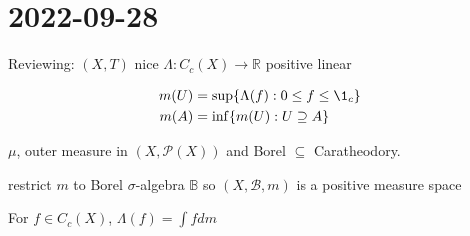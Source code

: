 \section{ 2022-09-28 }


Reviewing: $(X,T)$ nice $\Lambda : C_c (X) \to \mathbb{R}$ positive linear

\begin{align*}
	m(U) &= \sup\{\Lambda(f) : 0 \leq f \leq \1_c\} \\
	m(A) &= \inf\{m(U) : U \contains  A\}
\end{align*} 

\begin{lemma}
	$\mu$, outer measure in  $(X,\mathcal{P}(X))$ and Borel $\subseteq$ Caratheodory.
\end{lemma}

\begin{lemma}
	restrict $m$ to Borel $\sigma$-algebra $\mathbb{B}$ so $(X, \mathcal{B}, m)$ is a positive measure space
\end{lemma}

\begin{lemma}
	For $f \in C_c (X)$, $\Lambda(f) = \int f dm$
\end{lemma}

